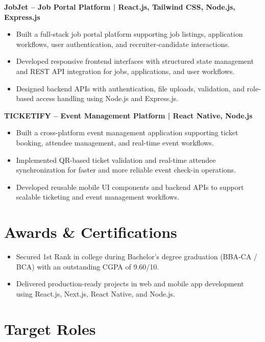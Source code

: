 \documentclass[a4paper,10pt]{article}
\begin{document}
\textbf{JobJet -- Job Portal Platform | React.js, Tailwind CSS, Node.js, Express.js}

\begin{itemize}[leftmargin=*]
    \item Built a full-stack job portal platform supporting job listings, application workflows, user authentication, and recruiter-candidate interactions.
    
    \item Developed responsive frontend interfaces with structured state management and REST API integration for jobs, applications, and user workflows.
    
    \item Designed backend APIs with authentication, file uploads, validation, and role-based access handling using Node.js and Express.js.
\end{itemize}

\textbf{TICKETIFY -- Event Management Platform | React Native, Node.js}

\begin{itemize}[leftmargin=*]
    \item Built a cross-platform event management application supporting ticket booking, attendee management, and real-time event workflows.
    
    \item Implemented QR-based ticket validation and real-time attendee synchronization for faster and more reliable event check-in operations.
    
    \item Developed reusable mobile UI components and backend APIs to support scalable ticketing and event management workflows.
\end{itemize}
    \section*{Awards \& Certifications}

    \begin{itemize}[leftmargin=*]
        \item Secured 1st Rank in college during Bachelor's degree graduation (BBA-CA / BCA) with an outstanding CGPA of 9.60/10.
        \item Delivered production-ready projects in web and mobile app development using React.js, Next.js, React Native, and Node.js.
    \end{itemize}

    \section*{Target Roles}
\end{document}
